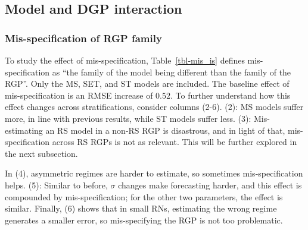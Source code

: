 \documentclass[
  letterpaper,
  DIV=11,
  numbers=noendperiod]{scrartcl}
\numberwithin{equation}{section}
\numberwithin{table}{section}
\numberwithin{figure}{section}
\begin{document}
\begin{table}[!htbp]

\caption{\label{tbl-fe_strat}Models fixed effects - across
stratifications}

\centering{



}

\end{table}%

\subsection{Model and DGP interaction}\label{sec-perf-mis}

\subsubsection{Mis-specification of RGP
family}\label{mis-specification-of-rgp-family}

To study the effect of mis-specification, Table~\ref{tbl-mis_is} defines
mis-specification as ``the family of the model being different than the
family of the RGP''. Only the MS, SET, and ST models are included. The
baseline effect of mis-specification is an RMSE increase of \(0.52\). To
further understand how this effect changes across stratifications,
consider columns (2-6). (2): MS models suffer more, in line with
previous results, while ST models suffer less. (3): Mis-estimating an RS
model in a non-RS RGP is disastrous, and in light of that,
mis-specification across RS RGPs is not as relevant. This will be
further explored in the next subsection.

In (4), asymmetric regimes are harder to estimate, so sometimes
mis-specification helps. (5): Similar to before, \(\sigma\) changes make
forecasting harder, and this effect is compounded by mis-specification;
for the other two parameters, the effect is similar. Finally, (6) shows
that in small RNs, estimating the wrong regime generates a smaller
error, so mis-specifying the RGP is not too problematic.

\begin{table}[!htbp]

\caption{\label{tbl-mis_is}Models and DGPs mis-specification}

\centering{



}

\end{table}%
\end{document}
